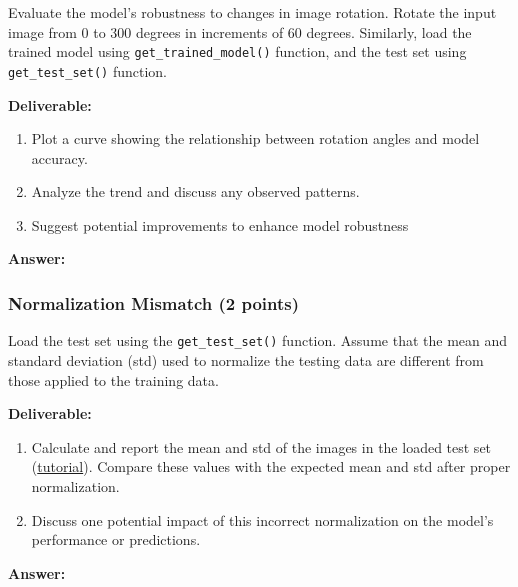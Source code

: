 \documentclass[11pt, oneside]{article}   	%
\begin{document}
Evaluate the model's robustness to changes in image rotation. Rotate the input image from $0$ to $300$ degrees in increments of $60$ degrees. 
Similarly, load the trained model using \texttt{get\_trained\_model()} function, and the test set using \texttt{get\_test\_set()} function. 

\noindent\textbf{Deliverable:}

\begin{enumerate}
    \item Plot a curve showing the relationship between rotation angles and model accuracy.
    \item Analyze the trend and discuss any observed patterns.
    \item Suggest potential improvements to enhance model robustness
\end{enumerate}



\begin{answerbox} \textbf{Answer:} \vspace*{1cm}

\end{answerbox}


\subsubsection*{Normalization Mismatch (2 points)}

Load the test set using the \texttt{get\_test\_set()} function. Assume that the mean and standard deviation (std) used to normalize the testing data are different from those applied to the training data.

\noindent\textbf{Deliverable:}

\begin{enumerate} \item Calculate and report the mean and std of the images in the loaded test set (\href{https://stackoverflow.com/questions/73350133/how-to-calculate-mean-and-standard-deviation-of-a-set-of-images}{tutorial}). Compare these values with the expected mean and std after proper normalization.

\item Discuss one potential impact of this incorrect normalization on the model's performance or predictions. 

\end{enumerate}

\begin{answerbox} \textbf{Answer:} \vspace*{1cm}


\end{answerbox}
\end{document}

